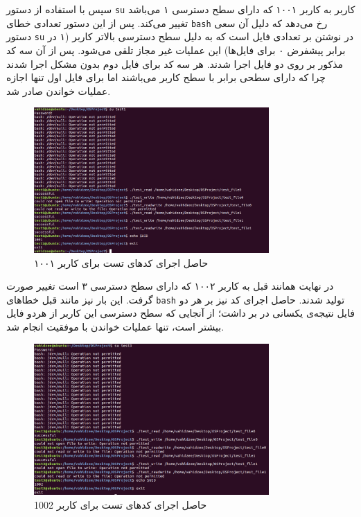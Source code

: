 \documentclass[13pt]{article}
\begin{document}
سپس با استفاده از دستور \texttt{su} کاربر به کاربر ۱۰۰۱ که دارای سطح دسترسی ۱ می‌باشد تغییر می‌کند. پس از  این دستور تعدادی خطای \texttt{bash} 
	رخ می‌دهد که دلیل آن سعی دستور \texttt{su} در نوشتن بر تعدادی فایل است که به دلیل سطح دسترسی بالاتر کاربر (۱ در برابر پیشفرض ۰ برای فایل‌ها) این عملیات غیر مجاز تلقی می‌شود. پس از آن سه کد مذکور بر روی دو فایل اجرا شدند. هر سه کد برای فایل دوم بدون مشکل اجرا شدند چرا که دارای سطحی برابر با سطح کاربر می‌باشند اما برای فایل اول تنها اجازه عملیات خواندن صادر شد.
      \begin{figure}[h]
      	\centering
      	\includegraphics[width=0.8\textwidth]{screenshots/user(1)-cmds.png}
      	\caption{حاصل اجرای کدهای تست برای کاربر ۱۰۰۱}
      \end{figure}
  
  در نهایت همانند قبل به کاربر ۱۰۰۲ که دارای سطح دسترسی ۳ است تغییر صورت گرفت. این بار نیز مانند قبل خطاهای \texttt{bash} تولید شدند. حاصل اجرای کد نیز بر هر دو فایل نتیجه‌ی یکسانی در بر داشت؛ از آنجایی که سطح دسترسی این کاربر از هردو فایل بیشتر است، تنها عملیات خواندن با موفقیت انجام شد.
  \begin{figure}[h]
  	\centering
  	\includegraphics[width=0.8\textwidth]{screenshots/user(3)-cmds.png}
  	\caption{حاصل اجرای کدهای تست برای کاربر 1002}
  \end{figure}
  
\end{document}
